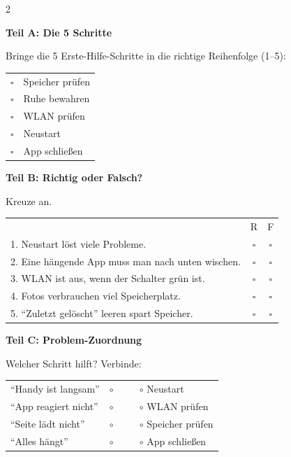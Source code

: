 \documentclass[a4paper,landscape,8pt]{extarticle}
\begin{document}
\begin{multicols}{2}

\textbf{\large Teil A: Die 5 Schritte}

Bringe die 5 Erste-Hilfe-Schritte in die richtige Reihenfolge (1--5):

\vspace{2mm}

\renewcommand{\arraystretch}{1.8}
\begin{tabular}{@{}cp{7cm}@{}}
$\square$ & Speicher prüfen \\
$\square$ & Ruhe bewahren \\
$\square$ & WLAN prüfen \\
$\square$ & Neustart \\
$\square$ & App schließen \\
\end{tabular}
\renewcommand{\arraystretch}{1}

\vspace{6mm}

\textbf{\large Teil B: Richtig oder Falsch?}

Kreuze an.

\vspace{2mm}

\renewcommand{\arraystretch}{1.6}
\begin{tabular}{@{}p{8cm}cc@{}}
& R & F \\
1. Neustart löst viele Probleme. & $\square$ & $\square$ \\
2. Eine hängende App muss man nach unten wischen. & $\square$ & $\square$ \\
3. WLAN ist aus, wenn der Schalter grün ist. & $\square$ & $\square$ \\
4. Fotos verbrauchen viel Speicherplatz. & $\square$ & $\square$ \\
5. ``Zuletzt gelöscht'' leeren spart Speicher. & $\square$ & $\square$ \\
\end{tabular}
\renewcommand{\arraystretch}{1}

\vspace{6mm}

\textbf{\large Teil C: Problem-Zuordnung}

Welcher Schritt hilft? Verbinde:

\vspace{2mm}

\renewcommand{\arraystretch}{1.8}
\begin{tabular}{@{}p{4cm}p{4.5cm}@{}}
``Handy ist langsam'' & $\circ$ ~~~~ $\circ$ Neustart \\
``App reagiert nicht'' & $\circ$ ~~~~ $\circ$ WLAN prüfen \\
``Seite lädt nicht'' & $\circ$ ~~~~ $\circ$ Speicher prüfen \\
``Alles hängt'' & $\circ$ ~~~~ $\circ$ App schließen \\
\end{tabular}
\renewcommand{\arraystretch}{1}


\end{multicols}
\end{document}

